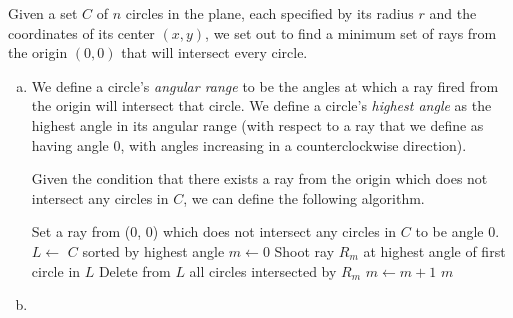 Given a set $C$ of $n$ circles in the plane, each specified by its radius $r$ and the coordinates of its center $(x, y)$, we set out to find a minimum set of rays from the origin $(0, 0)$ that will intersect every circle.

\begin{enumerate}[(a)]
	\item We define a circle's \emph{angular range} to be the angles at which a ray fired from the origin will intersect that circle. We define a circle's \emph{highest angle} as the highest angle in its angular range (with respect to a ray that we define as having angle 0, with angles increasing in a counterclockwise direction).
	
	Given the condition that there exists a ray from the origin which does not intersect any circles in $C$, we can define the following algorithm.
	
	\begin{algorithm}
		\caption{}
		\label{rays-circles1}
		\begin{algorithmic}
			\State Set a ray from (0, 0) which does not intersect any circles in $C$ to be angle 0.
			\State $L \gets$ $C$ sorted by highest angle
			\State $m \gets 0$
				\State Shoot ray $R_{m}$ at highest angle of first circle in $L$
				\State Delete from $L$ all circles intersected by $R_{m}$
				\State $m \gets m+1$
			\EndWhile
			\Return $m$
		\end{algorithmic}
	\end{algorithm}
	\item
\end{enumerate}